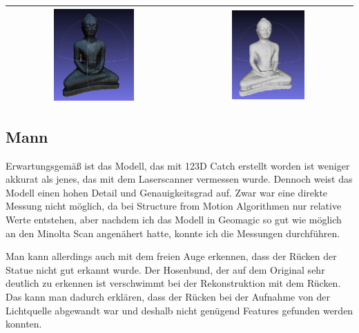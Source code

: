 \documentclass[]{article}
\begin{document}
\begin{table}[h]
\begin{center}
\begin{tabular}{| c | c |}
			\includegraphics[width=0.48\textwidth]{./Images/Budha/Budha_SfM_Textured_2.png} & \includegraphics[width=0.45\textwidth]{./Images/Budha/Budha_SfM_Untextured_2.png} \\
			\hline					  
		\end{tabular}
	\end{center}
	\label{tab:Budha-SfM}
\end{table}

\subsection{Mann}
Erwartungsgemäß ist das Modell, das mit 123D Catch erstellt worden ist weniger akkurat als jenes, das mit dem Laserscanner vermessen wurde. Dennoch weist das Modell einen hohen Detail und Genauigkeitsgrad auf. Zwar war eine direkte Messung nicht möglich, da bei Structure from Motion Algorithmen nur relative Werte entstehen, aber nachdem ich das Modell in Geomagic so gut wie möglich an den Minolta Scan angenähert hatte, konnte ich die Messungen durchführen.

Man kann allerdings auch mit dem freien Auge erkennen, dass der Rücken der Statue nicht gut erkannt wurde. Der Hosenbund, der auf dem Original sehr deutlich zu erkennen ist verschwimmt bei der Rekonstruktion mit dem Rücken. Das kann man dadurch erklären, dass der Rücken bei der Aufnahme von der Lichtquelle abgewandt war und deshalb nicht genügend Features gefunden werden konnten.
\end{document}
